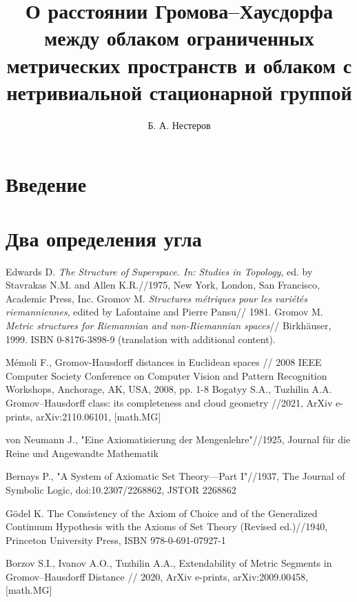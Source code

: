 \documentclass[11pt,twoside,draft
]{article}
\title
{%
О расстоянии Громова--Хаусдорфа между облаком ограниченных метрических пространств и облаком с нетривиальной стационарной группой 
}
{%
On the Gromov--Hausdorff distance between the cloud of bounded
metric spaces and a cloud with nontrivial stabilizer}
\author
{%
Б. А. Нестеров}
{%
B. A. Nesterov}
\begin{document}
\maketitle
\newpage

\section{Введение}  


\section{Два определения угла}  

\begin{thebibliography}{99}

	 Edwards D. \emph{The Structure of Superspace. In: Studies in Topology}, ed. by Stavrakas N.M. and Allen K.R.//1975, New York, London, San Francisco, Academic Press, Inc.
	 Gromov M. \emph{Structures m\'etriques pour les vari\'et\'es riemanniennes}, edited by Lafontaine and Pierre Pansu// 1981.
	 Gromov M. \emph{Metric structures for Riemannian and non-Riemannian spaces}// Birkh\"auser, 1999. ISBN 0-8176-3898-9 (translation with additional content).


	Mémoli F., Gromov-Hausdorff distances in Euclidean spaces // 2008 IEEE Computer Society Conference on Computer Vision and Pattern Recognition Workshops, Anchorage, AK, USA, 2008, pp. 1-8
	Bogatyy S.A., Tuzhilin A.A. Gromov–Hausdorff class: its completeness and cloud geometry //2021, ArXiv e-prints,
	arXiv:2110.06101, [math.MG]

	von Neumann J., "Eine Axiomatisierung der Mengenlehre"//1925, Journal für die Reine und Angewandte Mathematik

	Bernays P., "A System of Axiomatic Set Theory—Part I"//1937, The Journal of Symbolic Logic, doi:10.2307/2268862, JSTOR 2268862

	Gödel K. The Consistency of the Axiom of Choice and of the Generalized Continuum Hypothesis with the Axioms of Set Theory (Revised ed.)//1940, Princeton University Press,  ISBN 978-0-691-07927-1

	Borzov S.I., Ivanov A.O., Tuzhilin A.A., Extendability of Metric Segments in
	Gromov–Hausdorff Distance // 2020, ArXiv e-prints,
	arXiv:2009.00458, [math.MG]


\end{thebibliography}
\end{document}

